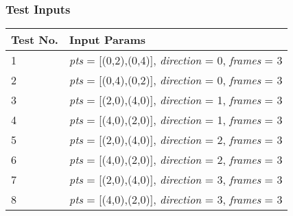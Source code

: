 \subsubsection{Test Inputs} \label{13_in}
\begin{tabular}{| l | l |}
    \hline 
    \textbf{Test No.} & \textbf{Input Params} \\
    \hline
    1                 & \textit{pts} = [(0,2),(0,4)], \textit{direction} = 0, \textit{frames} = 3 \\
    \hline 
     2                 & \textit{pts} = [(0,4),(0,2)], \textit{direction} = 0, \textit{frames} = 3 \\
    \hline 
    
     3                & \textit{pts} = [(2,0),(4,0)], \textit{direction} = 1, \textit{frames} = 3 \\
    \hline 
    
     4               & \textit{pts} = [(4,0),(2,0)], \textit{direction} = 1, \textit{frames} = 3 \\
    \hline 
    
      5               & \textit{pts} = [(2,0),(4,0)], \textit{direction} = 2, \textit{frames} = 3 \\
    \hline 
    
     6              & \textit{pts} = [(4,0),(2,0)], \textit{direction} = 2, \textit{frames} = 3 \\
    \hline 
    
       7               & \textit{pts} = [(2,0),(4,0)], \textit{direction} = 3, \textit{frames} = 3 \\
    \hline 
    
     8             & \textit{pts} = [(4,0),(2,0)], \textit{direction} = 3, \textit{frames} = 3 \\
    \hline 
\end{tabular}

